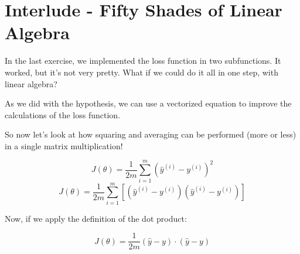 
\section*{Interlude - Fifty Shades of Linear Algebra}

In the last exercise, we implemented the loss function in two subfunctions.
It worked, but it's not very pretty.
What if we could do it all in one step, with linear algebra?   

As we did with the hypothesis, we can use a vectorized equation to improve the calculations of the loss function.

So now let's look at how squaring and averaging can be performed (more or less) in a single matrix multiplication!

$$
J(\theta) = \frac{1}{2m}\sum_{i=1}^{m}(\hat{y}^{(i)} - y^{(i)})^2
$$
$$
J(\theta) = \frac{1}{2m}\sum_{i=1}^{m}[(\hat{y}^{(i)} - y^{(i)}) (\hat{y}^{(i)} - y^{(i)})]
$$

Now, if we apply the definition of the dot product:

$$
J(\theta) = \frac{1}{2m}(\hat{y} - y) \cdot(\hat{y}- y)
$$